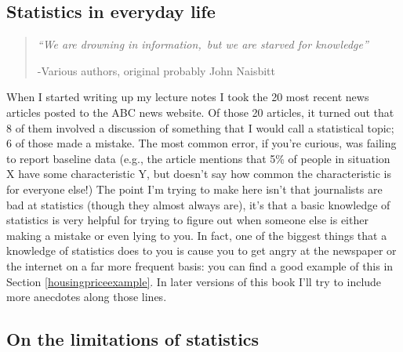\documentclass[]{book}
\begin{document}
\hypertarget{statistics-in-everyday-life}{%
\subsection{Statistics in everyday life}\label{statistics-in-everyday-life}}

\begin{quote}
\emph{``We are drowning in information,~but we are starved for knowledge''}

-Various authors, original probably John Naisbitt
\end{quote}

When I started writing up my lecture notes I took the 20 most recent news articles posted to the ABC news website. Of those 20 articles, it turned out that 8 of them involved a discussion of something that I would call a statistical topic; 6 of those made a mistake. The most common error, if you're curious, was failing to report baseline data (e.g., the article mentions that 5\% of people in situation X have some characteristic Y, but doesn't say how common the characteristic is for everyone else!) The point I'm trying to make here isn't that journalists are bad at statistics (though they almost always are), it's that a basic knowledge of statistics is very helpful for trying to figure out when someone else is either making a mistake or even lying to you. In fact, one of the biggest things that a knowledge of statistics does to you is cause you to get angry at the newspaper or the internet on a far more frequent basis: you can find a good example of this in Section \ref{housingpriceexample}. In later versions of this book I'll try to include more anecdotes along those lines.

\hypertarget{on-the-limitations-of-statistics}{%
\subsection{On the limitations of statistics}\label{on-the-limitations-of-statistics}}
\end{document}
